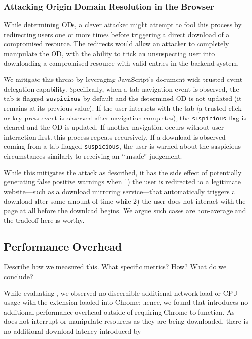 \subsubsection{Attacking Origin Domain Resolution in the Browser}

While determining ODs, a clever attacker might attempt to fool this process by
redirecting users one or more times before triggering a direct download of a
compromised resource. The redirects would allow an attacker to completely
manipulate the OD, with the ability to trick an unsuspecting user into
downloading a compromised resource with valid entries in the backend system.

We mitigate this threat by leveraging JavaScript's document-wide trusted event
delegation capability. Specifically, when a tab navigation event is observed,
the tab is flagged \texttt{suspicious} by default and the determined OD is not
updated (\ie it remains at its previous value). If the user interacts with the
tab (\ie a trusted click or key press event is observed after navigation
completes), the \texttt{suspicious} flag is cleared and the OD is updated. If
another navigation occurs without user interaction first, this process repeats
recursively. If a download is observed coming from a tab flagged
\texttt{suspicious}, the user is warned about the suspicious circumstances
similarly to receiving an ``unsafe'' judgement.

While this mitigates the attack as described, it has the side effect of
potentially generating false positive warnings when 1) the user is redirected to
a legitimate website---such as a download mirroring service---that automatically
triggers a download after some amount of time while 2) the user does not
interact with the page at all before the download begins. We argue such cases
are non-average and the tradeoff here is worthy.

\subsection{Performance Overhead}

Describe how we measured this. What specific metrics? How? What do we conclude?

While evaluating \SYSTEM{}, we observed no discernible additional network load
or CPU usage with the extension loaded into Chrome; hence, we found that
\SYSTEM{} introduces no additional performance overhead outside of requiring
Chrome to function. As \SYSTEM{} does not interrupt or manipulate resources as
they are being downloaded, there is no additional download latency introduced by
\SYSTEM{}.
